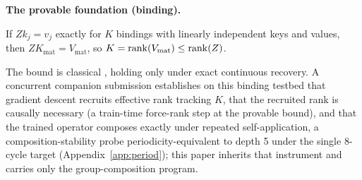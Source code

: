 \textbf{The provable foundation (binding).}
\begin{fact}
\label{fact:bound}
If $Z k_j = v_j$ exactly for $K$ bindings with linearly independent keys
and values, then $Z K_{\mathrm{mat}} = V_{\mathrm{mat}}$, so
$K = \operatorname{rank}(V_{\mathrm{mat}}) \leq \operatorname{rank}(Z)$.
\end{fact}

The bound is classical \citep{kohonen1972correlation,
anderson1972simple}, holding only under exact continuous recovery. A
concurrent companion submission establishes on this binding testbed
that gradient descent recruits effective rank tracking $K$, that the
recruited rank is causally necessary (a train-time force-rank step at
the provable bound), and that the trained operator composes exactly
under repeated self-application, a composition-stability probe
periodicity-equivalent to depth 5 under the single 8-cycle target
\citep{liu2023shortcuts} (Appendix~\ref{app:period}); this paper
inherits that instrument and carries only the group-composition
program.
